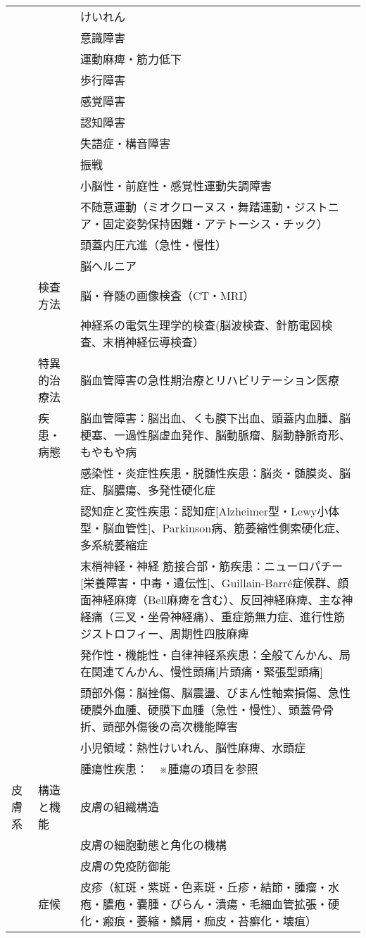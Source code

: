 \begin{xltabular}{\linewidth}{XXX}
 &  & けいれん \\
 &  & 意識障害 \\
 &  & 運動麻痺・筋力低下 \\
 &  & 歩行障害 \\
 &  & 感覚障害 \\
 &  & 認知障害 \\
 &  & 失語症・構音障害 \\
 &  & 振戦 \\
 &  & 小脳性・前庭性・感覚性運動失調障害 \\
 &  & 不随意運動（ミオクローヌス・舞踏運動・ジストニア・固定姿勢保持困難・アテトーシス・チック） \\
 &  & 頭蓋内圧亢進（急性・慢性） \\
 &  & 脳ヘルニア \\
 & 検査方法 & 脳・脊髄の画像検査（CT・MRI） \\
 &  & 神経系の電気生理学的検査(脳波検査、針筋電図検査、末梢神経伝導検査） \\
 & 特異的治療法 & 脳血管障害の急性期治療とリハビリテーション医療 \\
 & 疾患・病態 & 脳血管障害：脳出血、くも膜下出血、頭蓋内血腫、脳梗塞、一過性脳虚血発作、脳動脈瘤、脳動静脈奇形、もやもや病 \\
 &  & 感染性・炎症性疾患・脱髄性疾患：脳炎・髄膜炎、脳症、脳膿瘍、多発性硬化症 \\
 &  & 認知症と変性疾患：認知症[Alzheimer型・Lewy小体型・脳血管性]、Parkinson病、筋萎縮性側索硬化症、多系統萎縮症 \\
 &  & 末梢神経・神経 筋接合部・筋疾患：ニューロパチー[栄養障害・中毒・遺伝性]、Guillain-Barré症候群、顔面神経麻痺（Bell麻痺を含む）、反回神経麻痺、主な神経痛（三叉・坐骨神経痛）、重症筋無力症、進行性筋ジストロフィー、周期性四肢麻痺 \\
 &  & 発作性・機能性・自律神経系疾患：全般てんかん、局在関連てんかん、慢性頭痛[片頭痛・緊張型頭痛] \\
 &  & 頭部外傷：脳挫傷、脳震盪、びまん性軸索損傷、急性硬膜外血腫、硬膜下血腫（急性・慢性）、頭蓋骨骨折、頭部外傷後の高次機能障害 \\
 &  & 小児領域：熱性けいれん、脳性麻痺、水頭症 \\
 &  & 腫瘍性疾患：　※腫瘍の項目を参照 \\
皮膚系 & 構造と機能 & 皮膚の組織構造 \\
 &  & 皮膚の細胞動態と角化の機構 \\
 &  & 皮膚の免疫防御能 \\
 & 症候 & 皮疹（紅斑・紫斑・色素斑・丘疹・結節・腫瘤・水疱・膿疱・嚢腫・びらん・潰瘍・毛細血管拡張・硬化・瘢痕・萎縮・鱗屑・痂皮・苔癬化・壊疽） \\

\end{xltabular}
